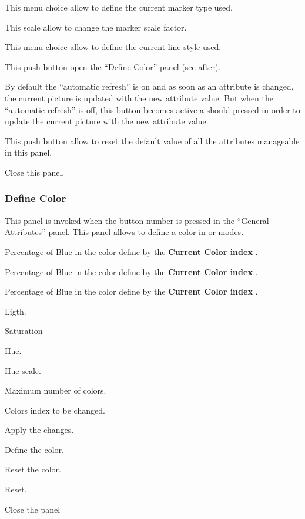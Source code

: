 \begin{EnumZW}
\item This menu choice allow to define the current marker type used.
\par
{}
\item This scale allow to change the marker scale factor.
\item This menu choice allow to define the current line style used.
\item This push button open the ``Define Color'' panel (see after).
\end{EnumZW}
\begin{EnumZB}
\item By default the ``automatic refresh'' is on and as soon as an attribute
      is changed, the current picture is updated with the new attribute
      value. But when the ``automatic refresh'' is off, this button becomes
      active a should pressed in order to update the current picture with
      the new attribute value. 
\item This push button allow to reset the default value of all the attributes
      manageable in this panel.
\item Close this panel.
\end{EnumZB}

\newpage

\subsubsection{Define Color}

This panel is invoked when the button number  is pressed in the
``General Attributes'' panel. This panel allows to define a color in
 or  modes.


\newpage
\begin{EnumZW}
\item Percentage of Blue in the color define by the {\bf Current Color index}
      .
\item Percentage of Blue in the color define by the {\bf Current Color index}
      .
\item Percentage of Blue in the color define by the {\bf Current Color index}
      .
\item Ligth.
\item Saturation
\item Hue.
\item Hue scale.
\item Maximum number of colors.
\item Colors index to be changed.
\end{EnumZW}
\begin{EnumZB}
\item Apply the changes.
\item Define the color.
\item Reset the color.
\item Reset.
\item Close the panel
\end{EnumZB}

